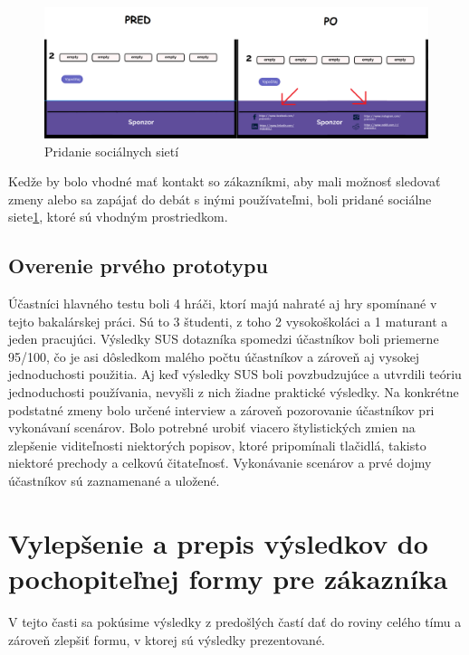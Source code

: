 \begin{figure}[h!]
	
	\includegraphics[width=.9\textwidth]{figures/4}
	
	\centering
	
	\caption{ Pridanie sociálnych sietí \label{4}}
	
\end{figure}

Kedže by bolo vhodné mať kontakt so zákazníkmi, aby mali možnosť sledovať zmeny alebo sa zapájať do debát s inými používateľmi, boli pridané sociálne siete\ref{4}, ktoré sú vhodným prostriedkom.





\subsection{Overenie prvého prototypu}



Účastníci hlavného testu boli 4 hráči, ktorí majú nahraté aj hry spomínané v tejto bakalárskej práci. Sú to 3 študenti, z toho 2 vysokoškoláci a 1 maturant a jeden pracujúci. Výsledky SUS dotazníka spomedzi účastníkov boli priemerne 95/100, čo je asi dôsledkom malého počtu účastníkov a zároveň aj vysokej jednoduchosti použitia. Aj keď výsledky SUS boli povzbudzujúce a utvrdili teóriu jednoduchosti používania, nevyšli z nich žiadne praktické výsledky. Na konkrétne podstatné zmeny bolo určené interview a zároveň pozorovanie účastníkov pri vykonávaní scenárov. Bolo potrebné urobiť viacero štylistických zmien na zlepšenie viditeľnosti niektorých popisov, ktoré pripomínali tlačidlá, takisto niektoré prechody a celkovú čitateľnosť. Vykonávanie scenárov a prvé dojmy účastníkov sú zaznamenané a uložené.

\section{Vylepšenie a prepis výsledkov do pochopiteľnej formy pre zákazníka}
V tejto časti sa pokúsime výsledky z predošlých častí dať do roviny celého tímu a zároveň zlepšiť formu, v ktorej sú výsledky prezentované.

